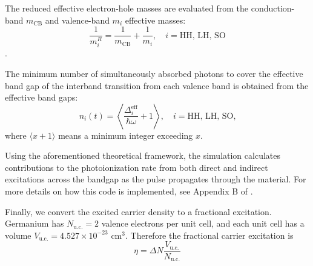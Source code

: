 The reduced effective electron-hole masses are evaluated from the conduction-band $m_{\textrm{CB}}$ and valence-band $m_i$ effective masses:
\begin{equation}
\frac{1}{m_i^R} = \frac{1}{m_{\textrm{CB}}} + \frac{1}{m_i}, \quad i = \textrm{HH, LH, SO}
\end{equation}.

The minimum number of simultaneously absorbed photons to cover the effective band gap of the interband transition from each valence band is obtained from the effective band gaps:
\begin{equation}
n_i(t) = \left\langle  \frac{\Delta_i^{\textrm{eff}}}{\hbar \omega} + 1 \right\rangle, \quad i = \textrm{HH, LH, SO,}
\label{eqn:min_number_photons}
\end{equation}
where $\langle x+1 \rangle$ means a minimum integer exceeding $x$.

Using the aforementioned theoretical framework, the simulation calculates contributions to the photoionization rate from both direct and indirect excitations across the bandgap as the pulse propagates through the material. For more details on how this code is implemented, see Appendix B of \cite{austinSemiconductorSurfaceModification2017}.

Finally, we convert the excited carrier density to a fractional excitation. Germanium has $N_{\text{u.c.}}=2$ valence electrons per unit cell, and each unit cell has a volume $V_{\text{u.c.}}=4.527 \times 10^{-23} \text{ cm}^{3}$. Therefore the fractional carrier excitation is
\begin{equation}
\eta = \Delta N \frac{V_{\text{u.c.}}}{N_{\text{u.c.}}}
\end{equation}

